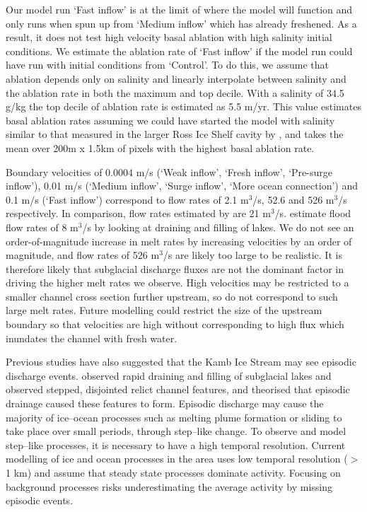 Our model run `Fast inflow' is at the limit of where the model will function and only runs when spun up from `Medium inflow' which has already freshened. As a result, it does not test high velocity basal ablation with high salinity initial conditions. We estimate the ablation rate of `Fast inflow' if the model run could have run with initial conditions from `Control'. To do this, we assume that ablation depends only on salinity and linearly interpolate between salinity and the ablation rate in both the maximum and top decile. With a salinity of 34.5 g/kg the top decile of ablation rate is estimated as 5.5 m/yr. This value estimates basal ablation rates assuming we could have started the model with salinity similar to that measured in the larger Ross Ice Shelf cavity by \cite{robinson2020ice}, and takes the mean over 200m x 1.5km of pixels with the highest basal ablation rate. 


Boundary velocities of 0.0004  $\mathrm{m}$/s (`Weak inflow', `Fresh inflow', `Pre-surge inflow'), 0.01  $\mathrm{m}$/s (`Medium inflow', `Surge inflow', `More ocean connection') and 0.1 $\mathrm{m}$/s (`Fast inflow') correspond to flow rates of 2.1 $\mathrm{m}^3$/s, 52.6 and 526 $\mathrm{m}^3$/s respectively. In comparison, flow rates estimated by \cite{le2009subglacial} are 21 $\mathrm{m}^3$/s. \cite{kim2016active} estimate flood flow rates of 8 $\mathrm{m}^3$/s by looking at draining and filling of lakes. We do not see an order-of-magnitude increase in melt rates by increasing velocities by an order of magnitude, and flow rates of 526 $\mathrm{m}^3$/s are likely too large to be realistic. It is therefore likely that subglacial discharge fluxes are not the dominant factor in driving the higher melt rates we observe. High velocities may be restricted to a smaller channel cross section further upstream, so do not correspond to such large melt rates. Future modelling could restrict the size of the upstream boundary so that velocities are high without corresponding to high flux which inundates the channel with fresh water.

Previous studies have also suggested that the Kamb Ice Stream may see episodic discharge events. \cite{kim2016active} observed rapid draining and filling of subglacial lakes and \cite{horgan2017poststagnation} observed stepped, disjointed relict channel features, and theorised that episodic drainage caused these features to form.
Episodic discharge may cause the majority of ice--ocean processes such as melting plume formation or sliding to take place over small periods, through step--like change. To observe and model step--like processes, it is necessary to have a high temporal resolution. Current modelling of ice and ocean processes in the area \citep[e.g.][]{holland2003ice} uses low temporal resolution ($>$1 km) and assume that steady state processes dominate activity. Focusing on background processes risks underestimating the average activity by missing episodic events.

